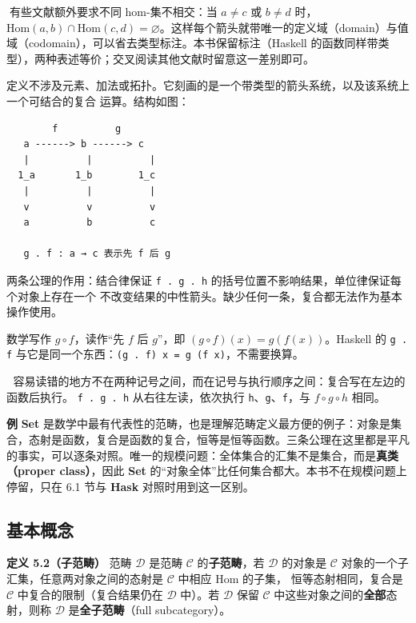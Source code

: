 📌有些文献额外要求不同 hom-集不相交：当 \(a \neq c\) 或 \(b \neq d\) 时，
\(\mathrm{Hom}(a, b) \cap \mathrm{Hom}(c, d) = \varnothing\)。这样每个箭头就带唯一的定义域（domain）与值域（codomain），可以省去类型标注。本书保留标注（Haskell 的函数同样带类型），两种表述等价；交叉阅读其他文献时留意这一差别即可。

定义不涉及元素、加法或拓扑。它刻画的是一个带类型的箭头系统，以及该系统上一个可结合的复合
运算。结构如图：

\begin{lstlisting}
        f          g
   a ------> b ------> c
   |          |          |
  1_a       1_b        1_c
   |          |          |
   v          v          v
   a          b          c

   g . f : a → c 表示先 f 后 g
\end{lstlisting}

两条公理的作用：结合律保证 \passthrough{\lstinline!f . g . h!} 的括号位置不影响结果，单位律保证每个对象上存在一个
不改变结果的中性箭头。缺少任何一条，复合都无法作为基本操作使用。

数学写作 \(g \circ f\)，读作“先 \(f\) 后 \(g\)”，即 \((g \circ f)(x) = g(f(x))\)。Haskell 的
\passthrough{\lstinline!g . f!} 与它是同一个东西：\passthrough{\lstinline!(g . f) x = g (f x)!}，不需要换算。

🦂 容易读错的地方不在两种记号之间，而在记号与执行顺序之间：复合写在左边的函数后执行。
\passthrough{\lstinline!f . g . h!} 从右往左读，依次执行 \passthrough{\lstinline!h!}、\passthrough{\lstinline!g!}、\passthrough{\lstinline!f!}，与 \(f \circ g \circ h\) 相同。

\textbf{例} \textbf{Set} 是数学中最有代表性的范畴，也是理解范畴定义最方便的例子：对象是集合，态射是函数，复合是函数的复合，恒等是恒等函数。三条公理在这里都是平凡的事实，可以逐条对照。唯一的规模问题：全体集合的汇集不是集合，而是\textbf{真类（proper class）}，因此 \textbf{Set} 的“对象全体”比任何集合都大。本书不在规模问题上停留，只在 6.1 节与 \textbf{Hask} 对照时用到这一区别。

\subsection{基本概念}\label{ux57faux672cux6982ux5ff5}

\textbf{定义 5.2（子范畴）} 范畴 \(\mathcal{D}\) 是范畴 \(\mathcal{C}\) 的\textbf{子范畴}，若 \(\mathcal{D}\) 的对象是
\(\mathcal{C}\) 对象的一个子汇集，任意两对象之间的态射是 \(\mathcal{C}\) 中相应 \(\mathrm{Hom}\) 的子集，
恒等态射相同，复合是 \(\mathcal{C}\) 中复合的限制（复合结果仍在 \(\mathcal{D}\) 中）。若 \(\mathcal{D}\)
保留 \(\mathcal{C}\) 中这些对象之间的\textbf{全部}态射，则称 \(\mathcal{D}\) 是\textbf{全子范畴}（full subcategory）。

